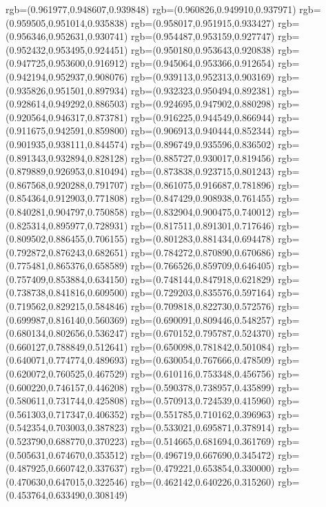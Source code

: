 {{{			rgb=(0.961977,0.948607,0.939848)
			rgb=(0.960826,0.949910,0.937971)
			rgb=(0.959505,0.951014,0.935838)
			rgb=(0.958017,0.951915,0.933427)
			rgb=(0.956346,0.952631,0.930741)
			rgb=(0.954487,0.953159,0.927747)
			rgb=(0.952432,0.953495,0.924451)
			rgb=(0.950180,0.953643,0.920838)
			rgb=(0.947725,0.953600,0.916912)
			rgb=(0.945064,0.953366,0.912654)
			rgb=(0.942194,0.952937,0.908076)
			rgb=(0.939113,0.952313,0.903169)
			rgb=(0.935826,0.951501,0.897934)
			rgb=(0.932323,0.950494,0.892381)
			rgb=(0.928614,0.949292,0.886503)
			rgb=(0.924695,0.947902,0.880298)
			rgb=(0.920564,0.946317,0.873781)
			rgb=(0.916225,0.944549,0.866944)
			rgb=(0.911675,0.942591,0.859800)
			rgb=(0.906913,0.940444,0.852344)
			rgb=(0.901935,0.938111,0.844574)
			rgb=(0.896749,0.935596,0.836502)
			rgb=(0.891343,0.932894,0.828128)
			rgb=(0.885727,0.930017,0.819456)
			rgb=(0.879889,0.926953,0.810494)
			rgb=(0.873838,0.923715,0.801243)
			rgb=(0.867568,0.920288,0.791707)
			rgb=(0.861075,0.916687,0.781896)
			rgb=(0.854364,0.912903,0.771808)
			rgb=(0.847429,0.908938,0.761455)
			rgb=(0.840281,0.904797,0.750858)
			rgb=(0.832904,0.900475,0.740012)
			rgb=(0.825314,0.895977,0.728931)
			rgb=(0.817511,0.891301,0.717646)
			rgb=(0.809502,0.886455,0.706155)
			rgb=(0.801283,0.881434,0.694478)
			rgb=(0.792872,0.876243,0.682651)
			rgb=(0.784272,0.870890,0.670686)
			rgb=(0.775481,0.865376,0.658589)
			rgb=(0.766526,0.859709,0.646405)
			rgb=(0.757409,0.853884,0.634150)
			rgb=(0.748144,0.847918,0.621829)
			rgb=(0.738738,0.841816,0.609500)
			rgb=(0.729203,0.835576,0.597164)
			rgb=(0.719562,0.829215,0.584846)
			rgb=(0.709818,0.822730,0.572576)
			rgb=(0.699987,0.816140,0.560369)
			rgb=(0.690091,0.809446,0.548257)
			rgb=(0.680134,0.802656,0.536247)
			rgb=(0.670152,0.795787,0.524370)
			rgb=(0.660127,0.788849,0.512641)
			rgb=(0.650098,0.781842,0.501084)
			rgb=(0.640071,0.774774,0.489693)
			rgb=(0.630054,0.767666,0.478509)
			rgb=(0.620072,0.760525,0.467529)
			rgb=(0.610116,0.753348,0.456756)
			rgb=(0.600220,0.746157,0.446208)
			rgb=(0.590378,0.738957,0.435899)
			rgb=(0.580611,0.731744,0.425808)
			rgb=(0.570913,0.724539,0.415960)
			rgb=(0.561303,0.717347,0.406352)
			rgb=(0.551785,0.710162,0.396963)
			rgb=(0.542354,0.703003,0.387823)
			rgb=(0.533021,0.695871,0.378914)
			rgb=(0.523790,0.688770,0.370223)
			rgb=(0.514665,0.681694,0.361769)
			rgb=(0.505631,0.674670,0.353512)
			rgb=(0.496719,0.667690,0.345472)
			rgb=(0.487925,0.660742,0.337637)
			rgb=(0.479221,0.653854,0.330000)
			rgb=(0.470630,0.647015,0.322546)
			rgb=(0.462142,0.640226,0.315260)
			rgb=(0.453764,0.633490,0.308149)
}}}
